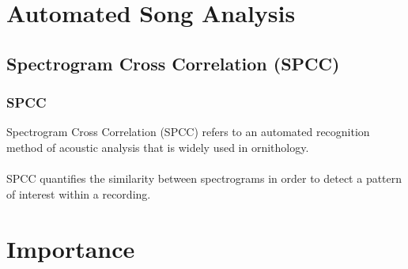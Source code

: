 \documentclass[12pt]{beamer}\usepackage[]{graphicx}\usepackage[]{color}
\begin{document}
\section{Automated Song Analysis}

\subsection{Spectrogram Cross Correlation (SPCC)}
\begin{frame}
\frametitle{SPCC}
Spectrogram Cross Correlation (SPCC) refers to an automated recognition method of acoustic analysis that is widely used in ornithology.\\~\\

SPCC quantifies the similarity between spectrograms in order to detect a pattern of interest within a recording.
\end{frame}




\section{Importance}
\end{document}
